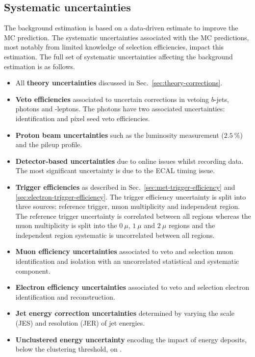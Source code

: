 \subsection{Systematic uncertainties}\label{sec:systs}

The \IWj background estimation is based on a data-driven estimate to improve the MC prediction. The systematic uncertainties associated with the MC predictions, most notably from limited knowledge of selection efficiencies, impact this estimation. The full set of systematic uncertainties affecting the background estimation is as follows.

\begin{itemize}
    \item All \textbf{theory uncertainties} discussed in Sec.~\ref{sec:theory-corrections}.
    \item \textbf{Veto efficiencies} associated to uncertain corrections in vetoing $b$-jets, photons and \Ptauh-leptons. The photons have two associated uncertainties: identification and pixel seed veto efficiencies.
    \item \textbf{Proton beam uncertainties} such as the luminosity measurement ($\SI{2.5}{\%}$) and the pileup profile.
    \item \textbf{Detector-based uncertainties} due to online issues whilst recording data. The most significant uncertainty is due to the ECAL timing issue.
    \item \textbf{Trigger efficiencies} as described in Sec.~\ref{sec:met-trigger-efficiency} and \ref{sec:electron-trigger-efficiency}. The \ptmiss trigger efficiency uncertainty is split into three sources: reference trigger, muon multiplicity and independent region. The reference trigger uncertainty is correlated between all regions whereas the muon multiplicity is split into the $0\ \mu$, $1\ \mu$ and $2\ \mu$ regions and the independent region systematic is uncorrelated between all regions.
    \item \textbf{Muon efficiency uncertainties} associated to veto and selection muon identification and isolation with an uncorrelated statistical and systematic component.
    \item \textbf{Electron efficiency uncertainties} associated to veto and selection electron identification and reconstruction.
    \item \textbf{Jet energy correction uncertainties} determined by varying the scale (JES) and resolution (JER) of jet energies.
    \item \textbf{Unclustered energy uncertainty} encoding the impact of energy deposits, below the clustering threshold, on \ptmiss.
\end{itemize}


